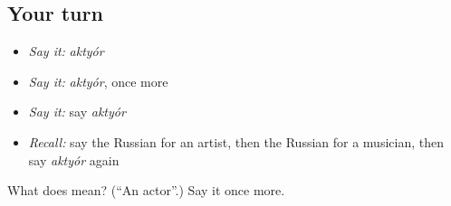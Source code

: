 \subsection*{Your turn}
\begin{itemize}
\raggedright
  \item \emph{Say it:} \emph{aktyór}
  \item \emph{Say it:} \emph{aktyór}, once more
  \item \emph{Say it:} say \emph{aktyór}
  \item \emph{Recall:} say the Russian for an artist, then the Russian for a musician, then say \emph{aktyór} again
\end{itemize}

\begin{tcolorbox}[breakable,colback=teal!4,colframe=teal!35!black,title={Before you move on}]
What does  mean? (\textquotedblleft{}An actor\textquotedblright{}.) Say it once more.
\end{tcolorbox}
